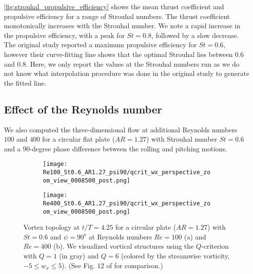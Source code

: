 \cref{fig:strouhal_propulsive_efficiency} shows the mean thrust coefficient and propulsive efficiency for a range of Strouhal numbers.
The thrust coefficient monotonically increases with the Strouhal number.
We note a rapid increase in the propulsive efficiency, with a peak for $St = 0.8$, followed by a slow decrease.
The original study reported a maximum propulsive efficiency for $St = 0.6$, however their curve-fitting line shows that the optimal Strouhal lies between $0.6$ and $0.8$.
Here, we only report the values at the Strouhal numbers run as we do not know what interpolation procedure was done in the original study to generate the fitted line.

\subsection{Effect of the Reynolds number}

We also computed the three-dimensional flow at additional Reynolds numbers $100$ and $400$ for a circular flat plate ($AR = 1.27$) with Strouhal number $St = 0.6$ and a $90$-degree phase difference between the rolling and pitching motions.

\begin{figure}[!h]
  \centering
  \begin{subfigure}[c]{0.45\textwidth}
    \centering
    \texttt{[image: Re100\_St0.6\_AR1.27\_psi90/qcrit\_wx\_perspective\_zoom\_view\_0008500\_post.png]}
    \caption{}
    \label{fig:reynolds_wake_topology:100_perspective}
  \end{subfigure}
  \hfill
  \begin{subfigure}[c]{0.45\textwidth}
    \centering
    \texttt{[image: Re400\_St0.6\_AR1.27\_psi90/qcrit\_wx\_perspective\_zoom\_view\_0008500\_post.png]}
    \caption{}
    \label{fig:reynolds_wake_topology:400_perspective}
  \end{subfigure}
  \caption{Vortex topology at $t / T = 4.25$ for a circular plate ($AR = 1.27$) with $St = 0.6$ and $\psi = 90^o$ at Reynolds numbers $Re = 100$ (a) and $Re = 400$ (b). We visualized vortical structures using the $Q$-criterion with $Q = 1$ (in gray) and $Q = 6$ (colored by the streamwise vorticity, $-5 \leq w_x \leq 5$). (See Fig. 12 of \citet{li_dong_2016} for comparison.)}
  \label{fig:reynolds_wake_topology}
\end{figure}

